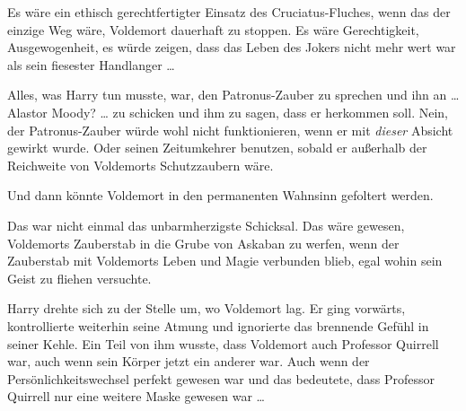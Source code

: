 Es wäre ein ethisch gerechtfertigter Einsatz des Cruciatus-Fluches, wenn das der einzige Weg wäre, Voldemort dauerhaft zu stoppen. Es wäre Gerechtigkeit, Ausgewogenheit, es würde zeigen, dass das Leben des Jokers nicht mehr wert war als sein fiesester Handlanger …

Alles, was Harry tun musste, war, den Patronus-Zauber zu sprechen und ihn an … Alastor Moody? … zu schicken und ihm zu sagen, dass er herkommen soll. Nein, der Patronus-Zauber würde wohl nicht funktionieren, wenn er mit \emph{dieser} Absicht gewirkt wurde. Oder seinen Zeitumkehrer benutzen, sobald er außerhalb der Reichweite von Voldemorts Schutzzaubern wäre.

Und dann könnte Voldemort in den permanenten Wahnsinn gefoltert werden.

Das war nicht einmal das unbarmherzigste Schicksal. Das wäre gewesen, Voldemorts Zauberstab in die Grube von Askaban zu werfen, wenn der Zauberstab mit Voldemorts Leben und Magie verbunden blieb, egal wohin sein Geist zu fliehen versuchte.

Harry drehte sich zu der Stelle um, wo Voldemort lag. Er ging vorwärts, kontrollierte weiterhin seine Atmung und ignorierte das brennende Gefühl in seiner Kehle. Ein Teil von ihm wusste, dass Voldemort auch Professor Quirrell war, auch wenn sein Körper jetzt ein anderer war. Auch wenn der Persönlichkeitswechsel perfekt gewesen war und das bedeutete, dass Professor Quirrell nur eine weitere Maske gewesen war …

